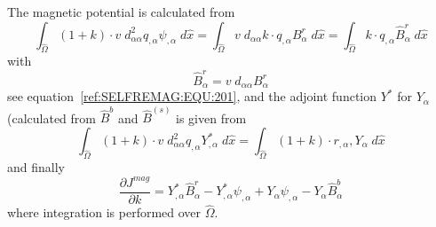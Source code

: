 The magnetic potential is calculated from 
\begin{equation}\label{ref:SELFREMAG:EQU:302}
\int_{\widehat{\Omega}} (1+k) \cdot v \; d_{\alpha \alpha}^2 q_{,\alpha} \psi_{,\alpha} \;  d\widehat{x}  
=  \int_{\widehat{\Omega}} v \; d_{\alpha \alpha} k \cdot q_{,\alpha}  B^r_{\alpha} \; d\widehat{x}   
=  \int_{\widehat{\Omega}}  k \cdot q_{,\alpha}  \widehat{B}^r_{\alpha} \; d\widehat{x}   
\end{equation} 
with 
\begin{equation}\label{ref:SELFREMAG:EQU:302b}
\widehat{B}^r_{\alpha}  =v \; d_{\alpha \alpha} B^r_{\alpha}
\end{equation} 
see equation~\ref{ref:SELFREMAG:EQU:201}, and the adjoint function $Y^*$ for $Y_{\alpha}$ (calculated from $\widehat{B}^b$ and $\widehat{B}^{(s)}$ is given from
\begin{equation}\label{ref:SELFREMAG:EQU:303}
\int_{\widehat{\Omega}}(1+k) \cdot  v \; d_{\alpha \alpha}^2 q_{,\alpha} Y^*_{,\alpha } \;d\widehat{x}  =
\int_{\widehat{\Omega}} (1+k) \cdot r_{,{\alpha}} ,Y_{\alpha}  \;d\widehat{x}
\end{equation} 
and finally 
\begin{equation}\label{ref:SELFREMAG:EQU:310}
\frac{\partial J^{mag}}{\partial k} = 
 Y^*_{,\alpha}   \widehat{B}^r_{\alpha} - Y^*_{,\alpha} \psi_{,\alpha} 
                         + Y_{\alpha}  \psi_{,\alpha} - Y_{\alpha}   \widehat{B}^b_{\alpha}
\end{equation} 
where integration is performed over $\widehat{\Omega}$.

